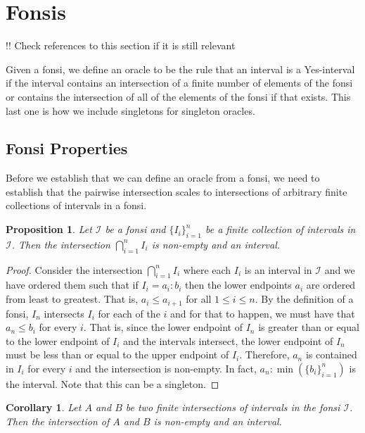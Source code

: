 \documentclass[12pt]{article}
\newtheorem{corollary}{Corollary}[subsection]
\newtheorem{proposition}{Proposition}[subsection]
\begin{document}
\section{Fonsis} \label{sec:ni}

!! Check references to this section if it is still relevant

Given a fonsi, we define an oracle to be the rule that an interval is a Yes-interval if the interval contains an intersection of a finite number of elements of the fonsi or contains the intersection of all of the elements of the fonsi if that exists. This last one is how we include singletons for singleton oracles. 


\subsection{Fonsi Properties}

Before we establish that we can define an oracle from a fonsi, we need to establish that the pairwise intersection scales to intersections of arbitrary finite collections of intervals in a fonsi. 

\begin{proposition}
 Let $\mathcal{I}$ be a fonsi and $\{I_i\}_{i=1}^n$ be a finite collection of intervals in $\mathcal{I}$. Then the intersection $\bigcap_{i=1}^n I_i$ is non-empty and an interval.
\end{proposition}

\begin{proof} 
    Consider the intersection $\bigcap_{i=1}^n I_i$ where each $I_i$ is an interval in $\mathcal{I}$ and we have ordered them such that if $I_i = a_i : b_i$ then the lower endpoints $a_i$ are ordered from least to greatest. That is,  $a_i \leq a_{i+1}$ for all $1 \leq i \leq n$. By the definition of a fonsi, $I_n$ intersects $I_i$ for each of the $i$ and for that to happen, we must have that $a_n \leq b_i$ for every $i$. That is, since the lower endpoint of $I_n$ is greater than or equal to the lower endpoint of $I_i$ and the intervals intersect, the lower endpoint of $I_n$ must be less than or equal to the upper endpoint of $I_i$. Therefore, $a_n$ is contained in $I_i$ for every $i$ and the intersection is non-empty. In fact, $a_n : \min(\{b_i\}_{i=1}^n)$ is the interval. Note that this can be a singleton. 
\end{proof}


\begin{corollary}
Let $A$ and $B$ be two finite intersections of intervals in the fonsi $\mathcal{I}$. Then the intersection of $A$ and $B$ is non-empty and an interval. 
\end{corollary}
\end{document}
